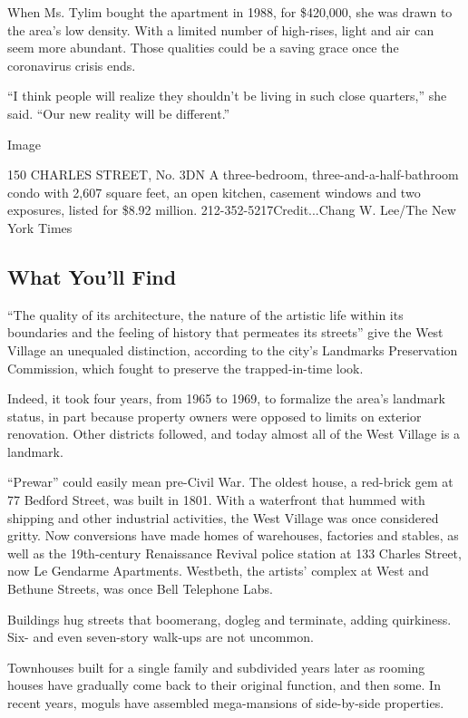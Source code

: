 When Ms. Tylim bought the apartment in 1988, for \$420,000, she was
drawn to the area's low density. With a limited number of high-rises,
light and air can seem more abundant. Those qualities could be a saving
grace once the coronavirus crisis ends.

``I think people will realize they shouldn't be living in such close
quarters,'' she said. ``Our new reality will be different.''

Image

150 CHARLES STREET, No. 3DN \textbar{} A three-bedroom,
three-and-a-half-bathroom condo with 2,607 square feet, an open kitchen,
casement windows and two exposures, listed for \$8.92 million.
212-352-5217Credit...Chang W. Lee/The New York Times

\hypertarget{what-youll-find}{%
\subsection{What You'll Find}\label{what-youll-find}}

``The quality of its architecture, the nature of the artistic life
within its boundaries and the feeling of history that permeates its
streets'' give the West Village an unequaled distinction, according to
the city's Landmarks Preservation Commission, which fought to preserve
the trapped-in-time look.

Indeed, it took four years, from 1965 to 1969, to formalize the area's
landmark status, in part because property owners were opposed to limits
on exterior renovation. Other districts followed, and today almost all
of the West Village is a landmark.

``Prewar'' could easily mean pre-Civil War. The oldest house, a
red-brick gem at 77 Bedford Street, was built in 1801. With a waterfront
that hummed with shipping and other industrial activities, the West
Village was once considered gritty. Now conversions have made homes of
warehouses, factories and stables, as well as the 19th-century
Renaissance Revival police station at 133 Charles Street, now Le
Gendarme Apartments. Westbeth, the artists' complex at West and Bethune
Streets, was once Bell Telephone Labs.

Buildings hug streets that boomerang, dogleg and terminate, adding
quirkiness. Six- and even seven-story walk-ups are not uncommon.

Townhouses built for a single family and subdivided years later as
rooming houses have gradually come back to their original function, and
then some. In recent years, moguls have assembled mega-mansions of
side-by-side properties.

